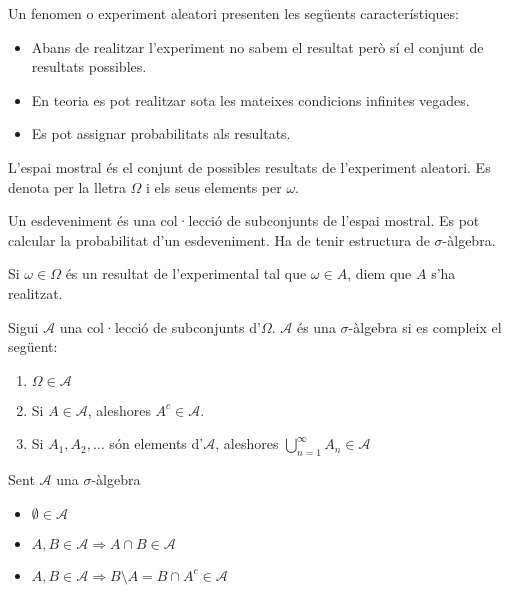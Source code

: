 \documentclass[../main.tex]{subfiles}
\begin{document}
    \begin{definicio}
        Un fenomen o experiment aleatori presenten les següents característiques:
        \begin{itemize}
            \item Abans de realitzar l'experiment no sabem el resultat però sí el conjunt de
            resultats possibles.
            \item En teoria es pot realitzar sota les mateixes condicions infinites vegades.
            \item Es pot assignar probabilitats als resultats.
        \end{itemize}
    \end{definicio}
    \begin{definicio}
        L'espai mostral és el conjunt de possibles resultats de l'experiment aleatori. Es denota per
        la lletra $\Omega$ i els seus elements per $\omega$.
    \end{definicio}
    \begin{definicio}
        Un esdeveniment és una col·lecció de subconjunts de l'espai mostral. Es pot calcular la
        probabilitat d'un esdeveniment. Ha de tenir estructura de $\sigma$-àlgebra.
    \end{definicio}
    \begin{notacio}
        Si $\omega \in \Omega$ és un resultat de l'experimental tal que $\omega \in A$, diem que $A$
        s'ha realitzat.
    \end{notacio}
    \begin{definicio}
        Sigui $\mathcal{A}$ una col·lecció de subconjunts d'$\Omega$. $\mathcal{A}$ és una
        $\sigma$-àlgebra si es compleix el següent:
        \begin{enumerate}
            \item $\Omega \in \mathcal{A}$
            \item Si $A \in \mathcal{A}$, aleshores $A^c \in \mathcal{A}$.
            \item Si $A_1, A_2, \dots$ són elements d'$\mathcal{A}$, aleshores $\bigcup\limits_{n=1}^\infty A_n \in \mathcal{A}$
        \end{enumerate}
    \end{definicio}
    \begin{corolari}
        Sent $\mathcal{A}$ una $\sigma$-àlgebra
        \begin{itemize}
            \item $\emptyset \in \mathcal{A}$
            \item $A, B \in \mathcal{A} \Rightarrow A \cap B \in \mathcal{A}$
            \item $A, B \in \mathcal{A} \Rightarrow B \setminus A = B\cap A^c \in \mathcal{A}$
        \end{itemize}
    \end{corolari}
\end{document}
